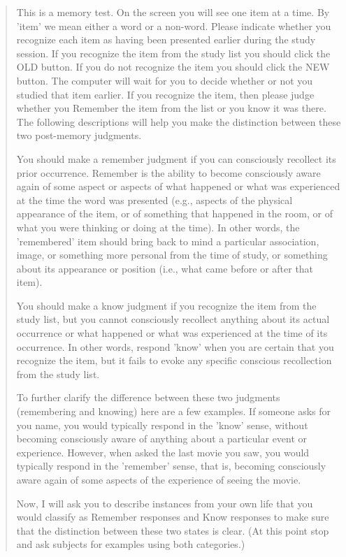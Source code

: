 \documentclass[english,,man,floatsintext]{apa6}
\begin{document}
\begin{quote}This is a memory test. On the screen you will see one item at a time. By 'item' we mean either a word or a non-word. Please indicate whether you recognize each item as having been presented earlier during the study session. If you recognize the item from the study list you should click the OLD button. If you do not recognize the item you should click the NEW button. The computer will wait for you to decide whether or not you studied that item earlier. If you recognize the item, then please judge whether you Remember the item from the list or you know it was there. The following descriptions will help you make the distinction between these two post-memory judgments.

You should make a remember judgment if you can consciously recollect its prior occurrence. Remember is the ability to become consciously aware again of some aspect or aspects of what happened or what was experienced at the time the word was presented (e.g., aspects of the physical appearance of the item, or of something that happened in the room, or of what you were thinking or doing at the time). In other words, the 'remembered' item should bring back to mind a particular association, image, or something more personal from the time of study, or something about its appearance or position (i.e., what came before or after that item).

You should make a know judgment if you recognize the item from the study list, but you cannot consciously recollect anything about its actual occurrence or what happened or what was experienced at the time of its occurrence. In other words, respond 'know' when you are certain that you recognize the item, but it fails to evoke any specific conscious recollection from the study list.

To further clarify the difference between these two judgments (remembering and knowing) here are a few examples. If someone asks for you name, you would typically respond in the 'know' sense, without becoming consciously aware of anything about a particular event or experience. However, when asked the last movie you saw, you would typically respond in the 'remember' sense, that is, becoming consciously aware again of some aspects of the experience of seeing the movie.

Now, I will ask you to describe instances from your own life that you would classify as Remember responses and Know responses to make sure that the distinction between these two states is clear. (At this point stop and ask subjects for examples using both categories.)


\end{quote}
\end{document}
